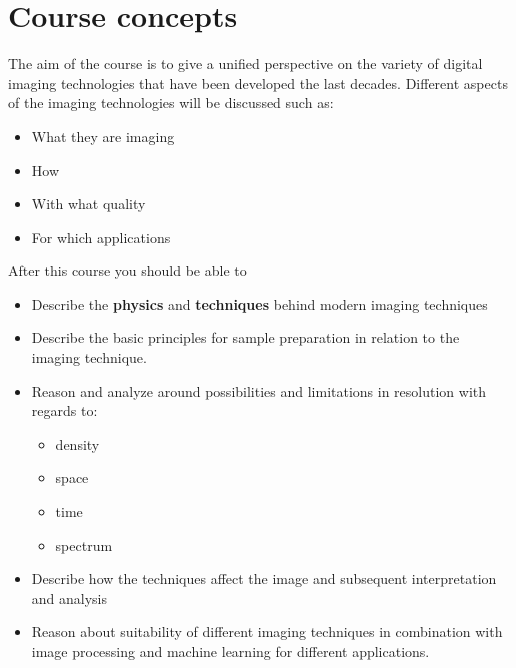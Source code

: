 
\section{Course concepts}
The aim of the course is to give a unified perspective on the variety of digital imaging technologies that have been developed the last decades. Different aspects of the imaging technologies will be discussed such as: 
\begin{itemize}
	\item What they are imaging
	\item How 
	\item With what quality
	\item For which applications 
\end{itemize}

After this course you should be able to 

\begin{itemize}
	\item Describe the \textbf{physics} and \textbf{techniques} behind modern imaging techniques
	\item Describe the basic principles for sample preparation in relation to the imaging technique.
	\item Reason and analyze around possibilities and limitations in resolution with regards to:
	\begin{itemize}
		\item density
		\item space
		\item time
		\item spectrum
	\end{itemize}
	\item Describe how the techniques affect the image and subsequent interpretation and analysis
	\item Reason about suitability of different imaging techniques in combination with image processing and machine learning for different applications. 
\end{itemize}

